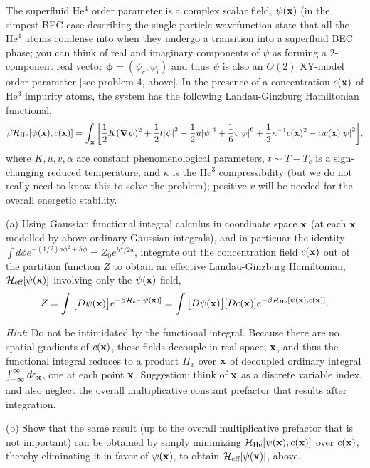 \documentclass[12pt]{article}
\begin{document}
\begin{problem}{5}
The superfluid He$^4$ order parameter is a complex scalar field, $\psi(\vb{x})$
(in the simpest BEC case describing the single-particle wavefunction state that
all the He$^4$ atoms condense into when they undergo a transition into a
superfluid BEC phase; you can think of real and imaginary components of $\psi$
as forming a 2-component real vector $\bm\phi=(\psi_r,\psi_i)$ and thus $\psi$
is also an $O(2)$ XY-model order parameter [see problem 4, above]. In the
presence of a concentration $c(\vb{x})$ of He$^3$ impurity atoms, the system has
the following Landau-Ginzburg Hamiltonian functional,
\begin{equation}
    \beta\mathcal{H}_{\text{He}}[\psi(\vb{x}),c(\vb{x})]=\int_{\vb{x}}
    \qty[\frac12K(\grad\psi)^2+\frac12t\abs{\psi}^2+\frac12u\abs{\psi}^4
    +\frac16v\abs{\psi}^6+\frac12\kappa^{-1}c(\vb{x})^2-\alpha
    c(\vb{x})\abs{\psi}^2],
\end{equation}
where $K,u,v,\alpha$ are constant phenomenological parameters, $t\sim T-T_c$ is
a sign-changing reduced temperature, and $\kappa$ is the He$^3$ compressibility
(but we do not really need to know this to solve the problem); positive $v$ will
be needed for the overall energetic stability.

(a) Using Gaussian functional integral calculus in coordinate space $\vb{x}$ (at
each $\vb{x}$ modelled by above ordinary Gaussian integrals), and in particuar
the identity $\int d\phi e^{-(1/2)a\phi^2+h\phi}=Z_0e^{h^2/2a}$, integrate out
the concentration field $c(\vb{x})$ out of the partition function $Z$ to obtain
an effective Landau-Ginzburg Hamiltonian, $\mathcal{H}_{\text{eff}}[\psi(\vb{x})]$ involving
only the $\psi(\vb{x})$ field,
\begin{equation}
    Z=\int\qty[D\psi(\vb{x})]e^{-\beta\mathcal{H}_{\text{eff}}[\psi(\vb{x})]}
    =\int\qty[D\psi(\vb{x})][Dc(\vb{x})]e^{-\beta\mathcal{H}_{\text{He}}[\psi(\vb{x}),c(\vb{x})]}.
\end{equation}

\textit{Hint}: Do not be intimidated by the functional integral. Because there
are no spatial gradients of $c(\vb{x})$, these fields decouple in real space,
$\vb{x}$, and thus the functional integral reduces to a product $\Pi_x$ over
$\vb{x}$ of decoupled ordinary integral $\int_{-\infty}^\infty dc_{\vb{x}}$, one
at each point $\vb{x}$. Suggestion: think of $\vb{x}$ as a discrete variable
index, and also neglect the overall multiplicative constant prefactor that
results after integration.

(b) Show that the same result (up to the overall multiplicative prefactor that
is not important) can be obtained by simply minimizing
$\mathcal{H}_{\text{He}}[\psi(\vb{x}),c(\vb{x})]$ over $c(\vb{x})$, thereby eliminating it in
favor of $\psi(\vb{x})$, to obtain $\mathcal{H}_{\text{eff}}[\psi(\vb{x})]$, above.


\end{problem}
\end{document}
